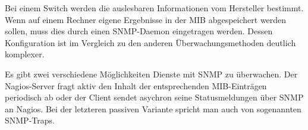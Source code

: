 Bei einem Switch werden die auslesbaren Informationen vom Hersteller bestimmt.
Wenn auf einem Rechner eigene Ergebnisse in der \gls{MIB} abgespeichert werden sollen, muss dies durch einen \gls{SNMP}-Daemon eingetragen werden.
Dessen Konfiguration ist im Vergleich zu den anderen Überwachungsmethoden deutlich komplexer.

Es gibt zwei verschiedene Möglichkeiten Dienste mit \gls{SNMP} zu überwachen.
Der Nagios-Server fragt aktiv den Inhalt der entsprechenden \gls{MIB}-Einträgen periodisch ab oder der Client sendet asychron seine Statusmeldungen über \gls{SNMP} an Nagios.
Bei der letzteren passiven Variante spricht man auch von sogenannten \gls{SNMP}-Traps.






